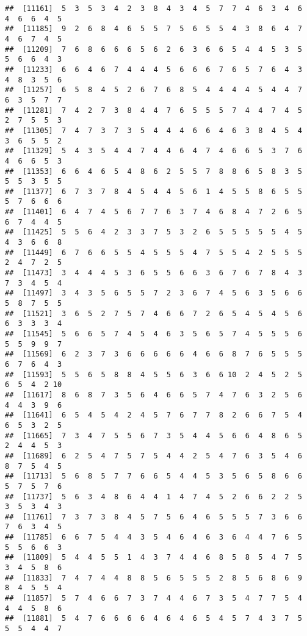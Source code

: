 \documentclass[
]{book}
\begin{document}
\begin{verbatim}
##  [11161]  5  3  5  3  4  2  3  8  4  3  4  5  7  7  4  6  3  4  6  4  6  6  4  5
##  [11185]  9  2  6  8  4  6  5  5  7  5  6  5  5  4  3  8  6  4  7  4  6  7  4  5
##  [11209]  7  6  8  6  6  6  5  6  2  6  3  6  6  5  4  4  5  3  5  5  6  6  4  3
##  [11233]  6  6  4  6  7  4  4  4  5  6  6  6  7  6  5  7  6  4  3  4  8  3  5  6
##  [11257]  6  5  8  4  5  2  6  7  6  8  5  4  4  4  4  5  4  4  7  6  3  5  7  7
##  [11281]  7  4  2  7  3  8  4  4  7  6  5  5  5  7  4  4  7  4  5  2  7  5  5  3
##  [11305]  7  4  7  3  7  3  5  4  4  4  6  6  4  6  3  8  4  5  4  3  6  5  5  2
##  [11329]  5  4  3  5  4  4  7  4  4  6  4  7  4  6  6  5  3  7  6  4  6  6  5  3
##  [11353]  6  6  4  6  5  4  8  6  2  5  5  7  8  8  6  5  8  3  5  5  5  3  5  5
##  [11377]  6  7  3  7  8  4  5  4  4  5  6  1  4  5  5  8  6  5  5  5  7  6  6  6
##  [11401]  6  4  7  4  5  6  7  7  6  3  7  4  6  8  4  7  2  6  5  6  7  4  4  5
##  [11425]  5  5  6  4  2  3  3  7  5  3  2  6  5  5  5  5  5  4  5  4  3  6  6  8
##  [11449]  6  7  6  6  5  5  4  5  5  5  4  7  5  5  4  2  5  5  5  2  4  7  2  5
##  [11473]  3  4  4  4  5  3  6  5  5  6  6  3  6  7  6  7  8  4  3  7  3  4  5  4
##  [11497]  3  4  3  5  6  5  5  7  2  3  6  7  4  5  6  3  5  6  6  5  8  7  5  5
##  [11521]  3  6  5  2  7  5  7  4  6  6  7  2  6  5  4  5  4  5  6  6  3  3  3  4
##  [11545]  5  6  6  5  7  4  5  4  6  3  5  6  5  7  4  5  5  5  6  5  5  9  9  7
##  [11569]  6  2  3  7  3  6  6  6  6  6  4  6  6  8  7  6  5  5  5  6  7  6  4  3
##  [11593]  5  5  6  5  8  8  4  5  5  6  3  6  6 10  2  4  5  2  5  6  5  4  2 10
##  [11617]  8  6  8  7  3  5  6  4  6  6  5  7  4  7  6  3  2  5  6  4  4  3  9  6
##  [11641]  6  5  4  5  4  2  4  5  7  6  7  7  8  2  6  6  7  5  4  6  5  3  2  5
##  [11665]  7  3  4  7  5  5  6  7  3  5  4  4  5  6  6  4  8  6  5  2  4  4  5  3
##  [11689]  6  2  5  4  7  5  7  5  4  4  2  5  4  7  6  3  5  4  6  8  7  5  4  5
##  [11713]  5  6  8  5  7  7  6  6  5  4  4  5  3  5  6  5  8  6  6  5  7  5  7  6
##  [11737]  5  6  3  4  8  6  4  4  1  4  7  4  5  2  6  6  2  2  5  3  5  3  4  3
##  [11761]  7  3  7  3  8  4  5  7  5  6  4  6  5  5  5  7  3  6  6  7  6  3  4  5
##  [11785]  6  6  7  5  4  4  3  5  4  6  4  6  3  6  4  4  7  6  5  5  5  6  6  3
##  [11809]  5  4  4  5  5  1  4  3  7  4  4  6  8  5  8  5  4  7  5  3  4  5  8  6
##  [11833]  7  4  7  4  4  8  8  5  6  5  5  5  2  8  5  6  8  6  9  8  4  5  5  4
##  [11857]  5  7  4  6  6  7  3  7  4  4  6  7  3  5  4  7  7  5  4  4  4  5  8  6
##  [11881]  5  4  7  6  6  6  6  4  6  4  6  5  4  5  7  4  3  7  5  5  5  4  4  7

\end{verbatim}
\end{document}
